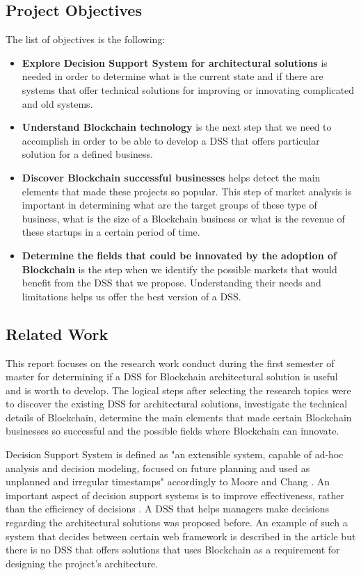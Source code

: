 \subsection{Project Objectives}
\label{sub-sec:intro-subsection2}
The list of objectives is the following:
\begin{itemize}
	\item \textbf{Explore Decision Support System for architectural solutions} is needed in order to determine what is the current state and if there are systems that offer technical solutions for improving or innovating complicated and old systems.
	\item \textbf{Understand Blockchain technology} is the next step that we need to accomplish in order to be able to develop a DSS that offers particular solution for a defined business.
	\item \textbf{Discover Blockchain successful businesses} helps detect the main elements that made these projects so popular. This step of market analysis is important in determining what are the target groups of these type of business, what is the size of a Blockchain business or what is the revenue of these startups in a certain period of time.
	\item \textbf{Determine the fields that could be innovated by the adoption of Blockchain} is the step when we identify the possible markets that would benefit from the DSS that we propose. Understanding their needs and limitations helps us offer the best version of a DSS.
\end{itemize}  

\subsection{Related Work}
\label{sub-sec:intro-subsection3}
This report focuses on the research work conduct during the first semester of master for determining if a DSS for Blockchain architectural solution is useful and is worth to develop.
The logical steps after selecting the research topics were to discover the existing DSS for architectural solutions, investigate the technical details of Blockchain, determine the main elements that made certain Blockchain businesses so successful and the possible fields where Blockchain can innovate.

Decision Support System is defined as "an extensible system, capable of ad-hoc analysis and
decision modeling, focused on future planning and used as unplanned and irregular timestamps"
accordingly to Moore and Chang \cite{def-dsss}. An important aspect of decision support systems is to
improve effectiveness, rather than the efficiency of decisions \cite{dds-efectiveness}.
A DSS that helps managers make decisions regarding the architectural solutions was proposed before. An example of such a system that decides between certain web framework is described in the article \cite{dss-web} but there is no DSS that offers solutions that uses Blockchain as a requirement for designing the project's architecture.

